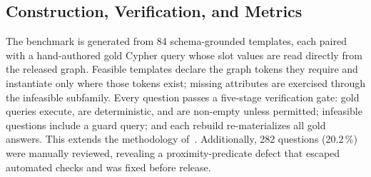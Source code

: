 \documentclass[sigconf,authordraft]{acmart}
\begin{document}

\subsection{Construction, Verification, and Metrics}

The benchmark is generated from 84 schema-grounded templates, each paired with a hand-authored gold Cypher query whose slot values are read directly from the released graph. Feasible templates declare the graph tokens they require and instantiate only where those tokens exist; missing attributes are exercised through the infeasible subfamily. Every question passes a five-stage verification gate: gold queries execute, are deterministic, and are non-empty unless permitted; infeasible questions include a guard query; and each rebuild re-materializes all gold answers. This extends the methodology of~\cite{chauhan_mindthequery_2025}. Additionally, \num{282} questions (20.2\,\%) were manually reviewed, revealing a proximity-predicate defect that escaped automated checks and was fixed before release.
\end{document}
